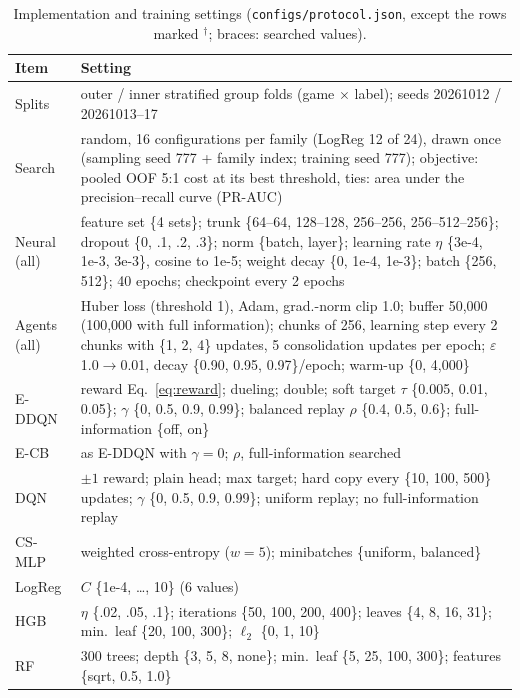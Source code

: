 \begin{table}[t]
\centering
\caption{Implementation and training settings (\texttt{configs/protocol.json}, except the rows marked $^\dagger$; braces: searched values).}
\label{tab:settings}
\scriptsize
\setlength{\tabcolsep}{2.5pt}
\begin{tabular}{@{}p{}p{}@{}}
\toprule
Item & Setting \\
\midrule
Splits & outer \nOuter{} / inner \nInner{} stratified group folds (game $\times$ label); seeds 20261012 / 20261013--17 \\
Search & random, 16 configurations per family (LogReg 12 of 24), drawn once (sampling seed 777 + family index; training seed 777); objective: pooled OOF 5:1 cost at its best threshold, ties: area under the precision--recall curve (PR-AUC) \\
Neural (all) & feature set \{4 sets\}; trunk \{64--64, 128--128, 256--256, 256--512--256\}; dropout \{0, .1, .2, .3\}; norm \{batch, layer\}; learning rate $\eta$ \{3e-4, 1e-3, 3e-3\}, cosine to 1e-5; weight decay \{0, 1e-4, 1e-3\}; batch \{256, 512\}; 40 epochs; checkpoint every 2 epochs \\
Agents (all) & Huber loss (threshold 1), Adam, grad.-norm clip 1.0; buffer 50,000 (100,000 with full information); chunks of 256, learning step every 2 chunks with \{1, 2, 4\} updates, 5 consolidation updates per epoch; $\varepsilon$ 1.0$\rightarrow$0.01, decay \{0.90, 0.95, 0.97\}/epoch; warm-up \{0, 4,000\} \\
E-DDQN & reward Eq.~\eqref{eq:reward}; dueling; double; soft target $\tau$ \{0.005, 0.01, 0.05\}; $\gamma$ \{0, 0.5, 0.9, 0.99\}; balanced replay $\rho$ \{0.4, 0.5, 0.6\}; full-information \{off, on\} \\
E-CB & as E-DDQN with $\gamma=0$; $\rho$, full-information searched \\
DQN & $\pm1$ reward; plain head; max target; hard copy every \{10, 100, 500\} updates; $\gamma$ \{0, 0.5, 0.9, 0.99\}; uniform replay; no full-information replay \\
CS-MLP & weighted cross-entropy ($w=5$); minibatches \{uniform, balanced\} \\
LogReg & $C$ \{1e-4, \dots, 10\} (6 values) \\
HGB & $\eta$ \{.02, .05, .1\}; iterations \{50, 100, 200, 400\}; leaves \{4, 8, 16, 31\}; min.\ leaf \{20, 100, 300\}; $\ell_2$ \{0, 1, 10\} \\
RF & 300 trees; depth \{3, 5, 8, none\}; min.\ leaf \{5, 25, 100, 300\}; features \{sqrt, 0.5, 1.0\} \\

\end{tabular}
\end{table}
